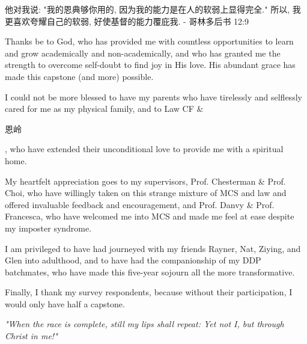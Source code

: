 \documentclass[
hidelinks,
12pt, %
oneside, %
english, %
doublespacing, %
headsepline, %
chapterinoneline, %
]{MastersDoctoralThesis} %
\begin{document}
\begin{acknowledgements}
\addchaptertocentry{\acknowledgementname} %
\begin{CJK*}{UTF8}{gbsn}
	他对我说: "我的恩典够你用的, 因为我的能力是在人的软弱上显得完全." 所以, 我更喜欢夸耀自己的软弱, 好使基督的能力覆庇我. - 哥林多后书 12:9
\end{CJK*}

Thanks be to God, who has provided me with countless opportunities to learn and grow academically and non-academically, and who has granted me the strength to overcome self-doubt to find joy in His love. His abundant grace has made this capstone (and more) possible.

I could not be more blessed to have my parents who have tirelessly and selflessly cared for me as my physical family, and to Law CF \& \begin{CJK*}{UTF8}{gbsn}恩岭\end{CJK*}, who have extended their unconditional love to provide me with a spiritual home.

My heartfelt appreciation goes to my supervisors, Prof. Chesterman \& Prof. Choi, who have willingly taken on this strange mixture of MCS and law and offered invaluable feedback and encouragement, and Prof. Danvy \& Prof. Francesca, who have welcomed me into MCS and made me feel at ease despite my imposter syndrome.

I am privileged to have had journeyed with my friends Rayner, Nat, Ziying, and Glen into adulthood, and to have had the companionship of my DDP batchmates, who have made this five-year sojourn all the more transformative. 

Finally, I thank my survey respondents, because without their participation, I would only have half a capstone.

\textit{"When the race is complete, still my lips shall repeat: Yet not I, but through Christ in me!"}

\end{acknowledgements}

\end{document}
